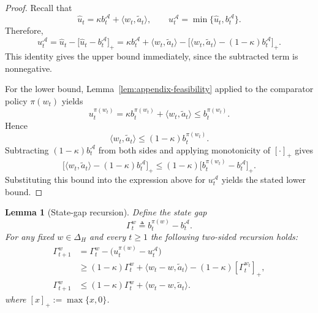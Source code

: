 \documentclass[11pt]{article}
\newtheorem{lemma}{Lemma}
\begin{document}
\begin{proof}
Recall that
\[
\widehat u_t = \kappa b_t^{\mathcal A}+\langle w_t,\widetilde a_t\rangle,
\qquad
u_t^{\mathcal A}=\min\{\widehat u_t,b_t^{\mathcal A}\}.
\]
Therefore,
\[
u_t^{\mathcal A}
=
\widehat u_t-\bigl[\widehat u_t-b_t^{\mathcal A}\bigr]_+
=
\kappa b_t^{\mathcal A}+\langle w_t,\widetilde a_t\rangle
-\bigl[\langle w_t,\widetilde a_t\rangle-(1-\kappa)b_t^{\mathcal A}\bigr]_+.
\]
This identity gives the upper bound immediately, since the subtracted term is nonnegative.

For the lower bound, Lemma~\ref{lem:appendix-feasibility} applied to the comparator policy \(\pi(w_t)\) yields
\[
u_t^{\pi(w_t)}
=
\kappa b_t^{\pi(w_t)}+\langle w_t,\widetilde a_t\rangle
\le b_t^{\pi(w_t)}.
\]
Hence
\[
\langle w_t,\widetilde a_t\rangle \le (1-\kappa)b_t^{\pi(w_t)}.
\]
Subtracting \((1-\kappa)b_t^{\mathcal A}\) from both sides and applying monotonicity of \([\cdot]_+\) gives
\[
\bigl[\langle w_t,\widetilde a_t\rangle-(1-\kappa)b_t^{\mathcal A}\bigr]_+
\le
(1-\kappa)\bigl[b_t^{\pi(w_t)}-b_t^{\mathcal A}\bigr]_+.
\]
Substituting this bound into the expression above for \(u_t^{\mathcal A}\) yields the stated lower bound.
\end{proof}

\begin{lemma}[State-gap recursion]
\label{lem:state-gap-recursion-eff}
Define the state gap
\begin{equation}
\label{eq:def-state-gap}
\Gamma_t^w \triangleq b_t^{\pi(w)} - b_t^{\mathcal A}.
\end{equation}
For any fixed $w\in\Delta_H$ and every $t\ge 1$ the following two-sided recursion holds:
\begin{align}
\Gamma_{t+1}^w
&= \Gamma_t^w - \bigl(u_t^{\pi(w)}-u_t^{\mathcal A}\bigr) \nonumber\\
&\ge (1-\kappa)\Gamma_t^w + \langle w_t-w,\widetilde a_t\rangle - (1-\kappa)[\Gamma_t^{w_t}]_+ ,\label{eq:GAMMA-Lower}\\[4pt]
\Gamma_{t+1}^w
&\le (1-\kappa)\Gamma_t^w + \langle w_t-w,\widetilde a_t\rangle.\label{eq:GAMMA-Upper}
\end{align}
where $[x]_+ := \max\{x,0\}$.
\end{lemma}
\end{document}

